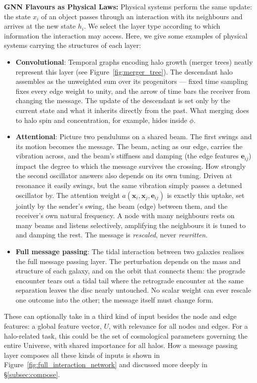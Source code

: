 \documentclass[graybox, envcountchap]{Template/svmult}
\begin{document}
\textbf{GNN Flavours as Physical Laws:} Physical systems perform the same update: the state $x_i$ of an object passes through an interaction with its neighbours and arrives at the new state $h_i$. We select the layer type according to which information the interaction may access. Here, we give some examples of physical systems carrying the structures of each layer:
\begin{itemize}
    \item \textbf{Convolutional}: Temporal graphs encoding halo growth (merger trees) neatly represent this layer (see Figure~\ref{fig:merger_tree}). The descendant halo assembles as the unweighted sum over its progenitors --- fixed time sampling fixes every edge weight to unity, and the arrow of time bars the receiver from changing the message. The update of the descendant is set only by the current state and what it inherits directly from the past. What merging does to halo spin and concentration, for example, hides inside $\phi$.
    \item \textbf{Attentional}: Picture two pendulums on a shared beam. The first swings and its motion becomes the message. The beam, acting as our edge, carries the vibration across, and the beam's stiffness and damping (the edge features $\mathbf{e}_{ij}$) impact the degree to which the message survives the crossing. How strongly the second oscillator answers also depends on its own tuning. Driven at resonance it easily swings, but the same vibration simply passes a detuned oscillator by. The attention weight $a(\mathbf{x}_i, \mathbf{x}_j, \mathbf{e}_{ij})$ is exactly this uptake, set jointly by the sender's swing, the beam (edge) between them, and the receiver's own natural frequency. A node with many neighbours rests on many beams and listens selectively, amplifying the neighbours it is tuned to and damping the rest. The message is \textit{rescaled}, never \textit{rewritten}.
    \item \textbf{Full message passing}: The tidal interaction between two galaxies realises the full message passing layer. The perturbation depends on the mass and structure of each galaxy, and on the orbit that connects them: the prograde encounter tears out a tidal tail where the retrograde encounter at the same separation leaves the disc nearly untouched. No scalar weight can ever rescale one outcome into the other; the message itself must change form.
\end{itemize}

These can optionally take in a third kind of input besides the node and edge features: a global feature vector, $U$, with relevance for all nodes and edges. For a halo-related task, this could be the set of cosmological parameters governing the entire Universe, with shared importance for all halos. How a message passing layer composes all these kinds of inputs is shown in Figure~\ref{fig:full_interaction_network} and discussed more deeply in \S\ref{subsec:compose}.
\end{document}
